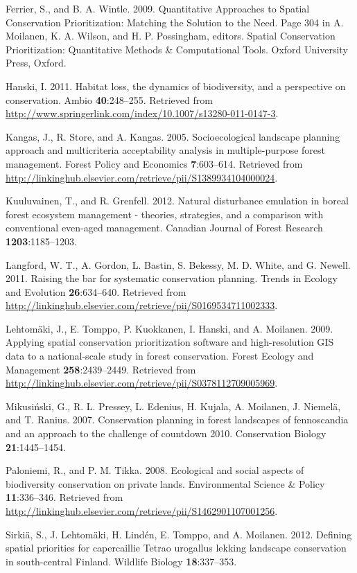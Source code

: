 \documentclass[]{article}
\begin{document}
Ferrier, S., and B. A. Wintle. 2009. Quantitative Approaches to Spatial
Conservation Prioritization: Matching the Solution to the Need. Page 304
in A. Moilanen, K. A. Wilson, and H. P. Possingham, editors. Spatial
Conservation Prioritization: Quantitative Methods \& Computational
Tools. Oxford University Press, Oxford.

Hanski, I. 2011. Habitat loss, the dynamics of biodiversity, and a
perspective on conservation. Ambio \textbf{40}:248--255. Retrieved from
\url{http://www.springerlink.com/index/10.1007/s13280-011-0147-3}.

Kangas, J., R. Store, and A. Kangas. 2005. Socioecological landscape
planning approach and multicriteria acceptability analysis in
multiple-purpose forest management. Forest Policy and Economics
\textbf{7}:603--614. Retrieved from
\url{http://linkinghub.elsevier.com/retrieve/pii/S1389934104000024}.

Kuuluvainen, T., and R. Grenfell. 2012. Natural disturbance emulation in
boreal forest ecosystem management - theories, strategies, and a
comparison with conventional even-aged management. Canadian Journal of
Forest Research \textbf{1203}:1185--1203.

Langford, W. T., A. Gordon, L. Bastin, S. Bekessy, M. D. White, and G.
Newell. 2011. Raising the bar for systematic conservation planning.
Trends in Ecology and Evolution \textbf{26}:634--640. Retrieved from
\url{http://linkinghub.elsevier.com/retrieve/pii/S0169534711002333}.

Lehtomäki, J., E. Tomppo, P. Kuokkanen, I. Hanski, and A. Moilanen.
2009. Applying spatial conservation prioritization software and
high-resolution GIS data to a national-scale study in forest
conservation. Forest Ecology and Management \textbf{258}:2439--2449.
Retrieved from
\url{http://linkinghub.elsevier.com/retrieve/pii/S0378112709005969}.

Mikusiński, G., R. L. Pressey, L. Edenius, H. Kujala, A. Moilanen, J.
Niemelä, and T. Ranius. 2007. Conservation planning in forest landscapes
of fennoscandia and an approach to the challenge of countdown 2010.
Conservation Biology \textbf{21}:1445--1454.

Paloniemi, R., and P. M. Tikka. 2008. Ecological and social aspects of
biodiversity conservation on private lands. Environmental Science \&
Policy \textbf{11}:336--346. Retrieved from
\url{http://linkinghub.elsevier.com/retrieve/pii/S1462901107001256}.

Sirkiä, S., J. Lehtomäki, H. Lindén, E. Tomppo, and A. Moilanen. 2012.
Defining spatial priorities for capercaillie Tetrao urogallus lekking
landscape conservation in south-central Finland. Wildlife Biology
\textbf{18}:337--353.
\end{document}
